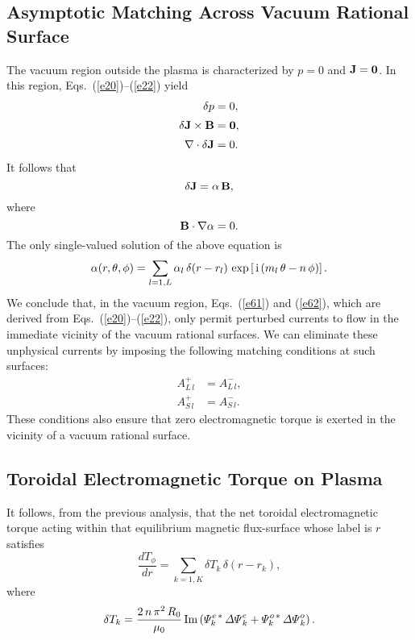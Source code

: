 \documentclass[12pt,prb,aps,notitlepage]{revtex4-1}
\begin{document}
\subsection{Asymptotic Matching Across Vacuum Rational Surface}
The  vacuum region outside the plasma is characterized by $p=0$ and ${\bf J}={\bf 0}$. In this region,  Eqs.~(\ref{e20})--(\ref{e22}) yield
\begin{align}
\delta p &=0,\\[0.5ex]
\delta {\bf J}\times {\bf B} &= {\bf 0},\\[0.5ex]
\nabla\cdot \delta{\bf J} &= 0.
\end{align}
It follows that 
\begin{equation}
\delta{\bf J} = \alpha\,{\bf B},
\end{equation}
where
\begin{equation}
{\bf B}\cdot\nabla \alpha=0.
\end{equation}
The only single-valued solution of the above equation is
\begin{equation}
\alpha(r,\theta,\phi) = \sum_{l=1,L} \alpha_l\,\delta(r-r_l)\,\exp\left[\,{\rm i}\,(m_l\,\theta-n\,\phi)\right].
\end{equation}
We conclude that, in the vacuum region, Eqs.~(\ref{e61}) and (\ref{e62}), which are derived from Eqs.~(\ref{e20})--(\ref{e22}),
only permit perturbed currents to flow in the immediate vicinity of the vacuum rational surfaces. We can eliminate these unphysical currents by
imposing the following matching conditions at such surfaces:
\begin{align}\label{e137}
A_{L\,l}^{+} &= A_{L\,l}^{-},\\[0.5ex]
A_{S\,l}^{+} &= A_{S\,l}^{-}.\label{e138}
\end{align}
These  conditions also ensure that zero electromagnetic torque is exerted in the vicinity of a vacuum rational surface.

\subsection{Toroidal Electromagnetic Torque on Plasma}
It follows, from the previous analysis,  that the
net toroidal electromagnetic torque acting within that equilibrium magnetic flux-surface whose label is $r$ satisfies
\begin{equation}\label{e126}
\frac{dT_\phi}{dr}= \sum_{k=1,K} \delta T_k \,\delta(r-r_k),
\end{equation}
where
\begin{equation}\label{e127}
\delta T_k = \frac{2\,n\,\pi^2\,R_0}{\mu_0}\,{\rm Im}\left(
{\mit\Psi}_k^{e\,\ast} \,{\mit\Delta\Psi}_k^{e}
+{\mit\Psi}_k^{o\,\ast} \,{\mit\Delta\Psi}_k^{o}\right).
\end{equation}
\end{document}
